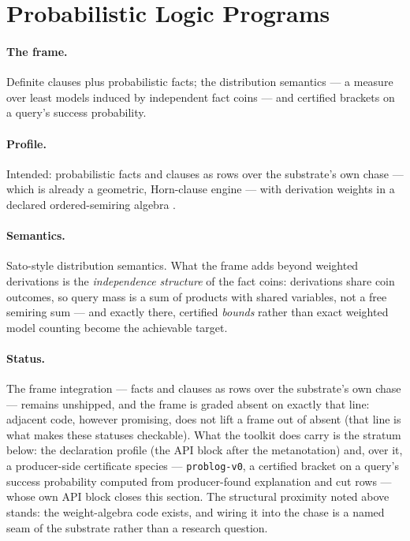 \section{Probabilistic Logic Programs}
\label{sec:mt-problog}

\paragraph{The frame.} Definite clauses plus probabilistic facts;
the distribution semantics --- a measure over least models induced
by independent fact coins --- and certified brackets on a query's
success probability.

\paragraph{Profile.} Intended: probabilistic facts and clauses as
rows over the substrate's own chase --- which is already a
geometric, Horn-clause engine --- with derivation weights in a
declared ordered-semiring algebra \cite{matache23}.

\paragraph{Semantics.} Sato-style distribution semantics. What the
frame adds beyond weighted derivations is the \emph{independence
structure} of the fact coins: derivations share coin outcomes, so
query mass is a sum of products with shared variables, not a free
semiring sum --- and exactly there, certified \emph{bounds} rather
than exact weighted model counting become the achievable target.

\paragraph{Status.} The frame integration --- facts and clauses as
rows over the substrate's own chase --- remains unshipped, and the
frame is graded absent on exactly that line: adjacent code, however
promising, does not lift a frame out of absent (that line is what
makes these statuses checkable). What the toolkit does carry is the
stratum below: the declaration profile (the API block after the
metanotation) and, over it, a producer-side certificate species ---
\texttt{problog-v0}, a certified bracket on a query's success
probability computed from producer-found explanation and cut rows
--- whose own API block closes this section. The structural
proximity noted above stands: the weight-algebra code exists, and
wiring it into the chase is a named seam of the substrate rather
than a research question.

